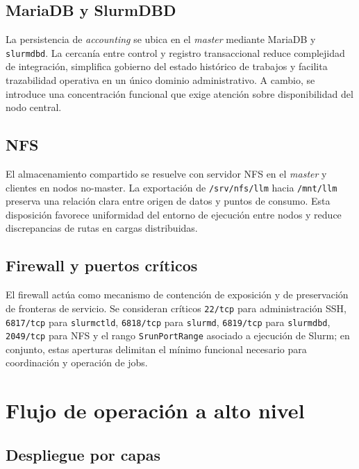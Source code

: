 \subsection{MariaDB y SlurmDBD}
\label{subsec:arq_db_slurmdbd}

La persistencia de \textit{accounting} se ubica en el \textit{master} mediante MariaDB y \texttt{slurmdbd}. La cercanía entre control y registro transaccional reduce complejidad de integración, simplifica gobierno del estado histórico de trabajos y facilita trazabilidad operativa en un único dominio administrativo. A cambio, se introduce una concentración funcional que exige atención sobre disponibilidad del nodo central.

\subsection{NFS}
\label{subsec:arq_nfs}

El almacenamiento compartido se resuelve con servidor NFS en el \textit{master} y clientes en nodos no-master. La exportación de \texttt{/srv/nfs/llm} hacia \texttt{/mnt/llm} preserva una relación clara entre origen de datos y puntos de consumo. Esta disposición favorece uniformidad del entorno de ejecución entre nodos y reduce discrepancias de rutas en cargas distribuidas.

\subsection{Firewall y puertos críticos}
\label{subsec:arq_firewall}

El firewall actúa como mecanismo de contención de exposición y de preservación de fronteras de servicio. Se consideran críticos \texttt{22/tcp} para administración SSH, \texttt{6817/tcp} para \texttt{slurmctld}, \texttt{6818/tcp} para \texttt{slurmd}, \texttt{6819/tcp} para \texttt{slurmdbd}, \texttt{2049/tcp} para NFS y el rango \texttt{SrunPortRange} asociado a ejecución de Slurm; en conjunto, estas aperturas delimitan el mínimo funcional necesario para coordinación y operación de jobs.

\section{Flujo de operación a alto nivel}
\label{sec:arq_flujo_operacion}

\subsection{Despliegue por capas}
\label{subsec:arq_despliegue_capas}

